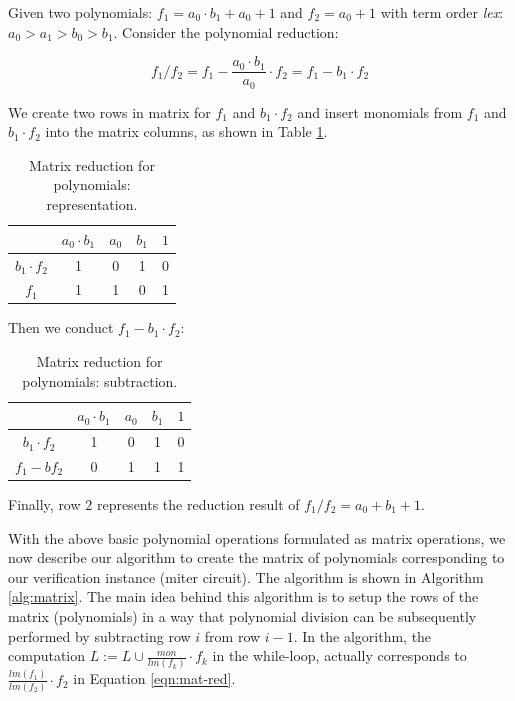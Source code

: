 \begin{Example}\label{exp:division}
Given two polynomials: $f_{1}=a_{0}\cdot b_{1}+a_{0}+1$ and
$f_{2}=a_{0}+1$ with term order {\it lex}:
$a_{0}>a_{1}>b_{0}>b_{1}$. Consider the polynomial reduction:

\begin{equation}
{f_1}/{f_2}=f_{1}-\frac{a_{0}\cdot b_{1}}{a_{0}}\cdot f_{2} =f_{1}-b_{1}\cdot f_{2} \nonumber
\end{equation}
	 
We create two rows in matrix for $f_{1}$ and $b_{1}\cdot f_{2}$ and
insert monomials from $f_{1}$ and $b_{1}\cdot f_{2}$ into the matrix
columns, as shown in Table \ref{tab:red}.  
	 
	\begin{table}[t]
	\begin{center}
	\caption{Matrix reduction for polynomials: representation.}
	\label{tab:red}
	\begin{tabular}{|c|c|c|c|c|} \hline 
			&$a_{0} \cdot b_{1}$ & $a_{0}$ & $b_{1}$ & $1$  \\
	\hline 
	$b_{1}\cdot f_{2}$ & 1 &0 & 1  & 0 \\ 
	\hline
	$f_{1}$ & 1 &1 & 0 & 1  \\
	\hline
	\end{tabular}
	\end{center}
	\end{table}
	
	Then we conduct $f_{1}-b_{1}\cdot f_{2}$:
	
	\begin{table}[b]
	\begin{center}
	\caption{Matrix reduction for polynomials: subtraction.}
	\label{tab:red2}
	\begin{tabular}{|c|c|c|c|c|} \hline 
			&$a_{0} \cdot b_{1}$ & $a_{0}$ & $b_{1}$ & $1$  \\
	\hline 
	$b_{1}\cdot f_{2}$ & 1 &0 & 1  & 0 \\ 
	\hline
	$f_{1} - b f_2$ & 0 &1 & 1 & 1  \\
	\hline
	\end{tabular}
	\end{center}
	\end{table}
	
	Finally, row $2$ represents the reduction result of ${f_1}/{f_2}=a_{0}+b_{1}+1$.
	
 \end{Example}

With the above basic polynomial operations formulated as matrix
operations, we now describe our algorithm to create the matrix of
polynomials corresponding to our verification instance (miter
circuit). The algorithm is shown in Algorithm \ref{alg:matrix}. The
main idea behind this algorithm is to setup the rows  of
the matrix (polynomials) in a way that polynomial division can be
subsequently performed by subtracting row $i$ from row $i-1$. In the
algorithm, the computation $L:=L \cup \frac{mon}{lm(f_{k})}\cdot
f_{k}$ in the while-loop, actually corresponds to  
$\frac{lm(f_1)}{lm(f_2)}\cdot f_{2} $ in Equation \ref{eqn:mat-red}. 

